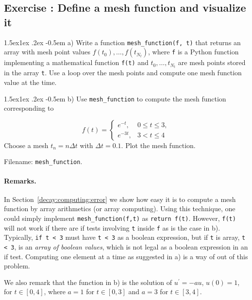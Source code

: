 \documentclass[%
oneside,                 %
final,                   %
10pt]{article}
\makeatletter
\newenvironment{doconceexercise}{}{}
\newcounter{doconceexercisecounter}
\newcommand\subex{\@startsection{paragraph}{4}{\z@}%
                  {1.5ex\@plus1ex \@minus.2ex}%
                  {-0.5em}%
                  {\normalfont\normalsize\bfseries}}
\makeatother
\begin{document}
\begin{doconceexercise}

\subsection*{Exercise \thedoconceexercisecounter: Define a mesh function and visualize it}

\label{decay:exer:meshfunc}


\subex{a)}
Write a function \Verb!mesh_function(f, t)! that returns an array with
mesh point values $f(t_0),\ldots,f(t_{N_t})$, where \texttt{f} is a Python
function implementing a mathematical function \texttt{f(t)} and $t_0,\ldots,t_{N_t}$
are mesh points stored in the array \texttt{t}. Use a loop over the mesh
points and compute one mesh function value at the time.



\subex{b)}
Use \Verb!mesh_function! to compute the mesh function corresponding to

\[
f(t) = \left\lbrace
\begin{array}{ll}
e^{-t},& 0\leq t\leq 3,\\ 
e^{-3t}, & 3 < t\leq 4
\end{array}\right.
\]
Choose a mesh $t_n=n\Delta t$ with $\Delta t=0.1$.
Plot the mesh function.





\noindent Filename: \Verb!mesh_function!.


\paragraph{Remarks.}
In Section~\ref{decay:computing:error} we show how easy it is to
compute a mesh function by array arithmetics (or array computing).
Using this technique, one could simply implement \Verb!mesh_function(f,t)!
as \texttt{return f(t)}. However, \texttt{f(t)} will not work if there are
if tests involving \texttt{t} inside \texttt{f} as is the case in b). Typically,
\texttt{if t < 3} must have \texttt{t < 3} as a boolean expression, but if \texttt{t} is
array, \texttt{t < 3}, is an \emph{array of boolean values}, which is not legal
as a boolean expression in an if test.
Computing one element
at a time as suggested in a) is a way of out of this problem.

We also remark that the function in b) is the solution of $u^{\prime}=-au$,
$u(0)=1$, for $t\in [0,4]$, where $a=1$ for $t\in [0,3]$ and $a=3$ for
$t\in [3,4]$.


\end{doconceexercise}
\end{document}

